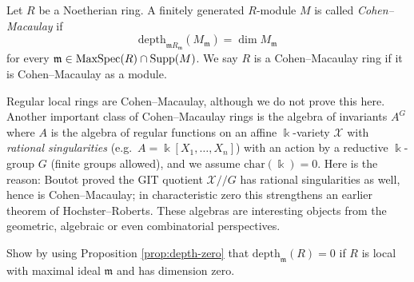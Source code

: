 \begin{definition}
	Let $R$ be a Noetherian ring. A finitely generated $R$-module $M$ is called \emph{Cohen--Macaulay} if
	\[ \mathrm{depth}_{\mathfrak{m}R_{\mathfrak{m}} }(M_{\mathfrak{m}}) = \dim M_{\mathfrak{m}} \]
	for every $\mathfrak{m} \in \operatorname{MaxSpec}(R) \cap \operatorname{Supp}(M)$. We say $R$ is a Cohen--Macaulay ring if it is Cohen--Macaulay as a module.
\end{definition}

\begin{example}
	Regular local rings are Cohen--Macaulay, although we do not prove this here. Another important class of Cohen--Macaulay rings is the algebra of invariants $A^G$ where $A$ is the algebra of regular functions on an affine $\Bbbk$-variety $\mathcal{X}$ with \emph{rational singularities} (e.g.\ $A = \Bbbk[X_1, \ldots, X_n]$) with an action by a reductive $\Bbbk$-group $G$ (finite groups allowed), and we assume $\text{char}(\Bbbk)=0$. Here is the reason: Boutot \cite{Bou87} proved the GIT quotient $\mathcal{X}/\!/G$ has rational singularities as well, hence is Cohen--Macaulay; in characteristic zero this strengthens an earlier theorem of Hochster--Roberts. These algebras are interesting objects from the geometric, algebraic or even combinatorial perspectives.
\end{example}

\begin{exercise}
	Show by using Proposition \ref{prop:depth-zero} that $\text{depth}_{\mathfrak{m}}(R) = 0$ if $R$ is local with maximal ideal $\mathfrak{m}$ and has dimension zero.
\end{exercise}

